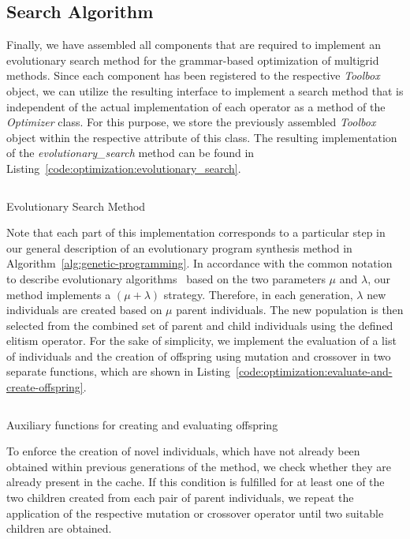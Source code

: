 \subsection{Search Algorithm}
Finally, we have assembled all components that are required to implement an evolutionary search method for the grammar-based optimization of multigrid methods.
Since each component has been registered to the respective \emph{Toolbox} object, we can utilize the resulting interface to implement a search method that is independent of the actual implementation of each operator as a method of the \emph{Optimizer} class. 
For this purpose, we store the previously assembled \emph{Toolbox} object within the respective attribute of this class.
The resulting implementation of the \emph{evolutionary\_search} method can be found in Listing~\ref{code:optimization:evolutionary_search}. 
\begin{listing}
	\inputminted[linenos]{python}{evostencils/optimization/evolutionary_search.py}
	\caption{Evolutionary Search Method}
	\label{code:optimization:evolutionary_search}
\end{listing}
Note that each part of this implementation corresponds to a particular step in our general description of an evolutionary program synthesis method in Algorithm~\ref{alg:genetic-programming}.
In accordance with the common notation to describe evolutionary algorithms~\cite{back1997handbook} based on the two parameters $\mu$ and $\lambda$, our method implements a $\left(\mu + \lambda \right)$ strategy.
Therefore, in each generation, $\lambda$ new individuals are created based on $\mu$ parent individuals.
The new population is then selected from the combined set of parent and child individuals using the defined elitism operator.
For the sake of simplicity, we implement the evaluation of a list of individuals and the creation of offspring using mutation and crossover in two separate functions, which are shown in Listing~\ref{code:optimization:evaluate-and-create-offspring}.
\begin{listing}
	\inputminted{python}{evostencils/optimization/evolutionary_search_helper.py}
	\caption{Auxiliary functions for creating and evaluating offspring}
	\label{code:optimization:evaluate-and-create-offspring}
\end{listing}
To enforce the creation of novel individuals, which have not already been obtained within previous generations of the method, we check whether they are already present in the cache.
If this condition is fulfilled for at least one of the two children created from each pair of parent individuals, we repeat the application of the respective mutation or crossover operator until two suitable children are obtained.

